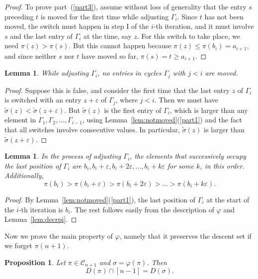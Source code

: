 \documentclass[11pt]{amsart}
\newtheorem{prop}[theorem]{Proposition}
\newtheorem{lemma}[theorem]{Lemma}
\newcommand\C{\mathcal C}
\newcommand\wt{\widetilde}
\newcommand\bij{\varphi}
\newcommand\eps{\varepsilon}
\newcommand\sigm{\wt\sigma}
\begin{document}
\begin{proof}
To prove part~(\ref{part3}), assume without loss of generality that the entry $s$ preceding $t$ is moved for the first time while adjusting $\Gamma_i$.
Since $t$ has not been moved, the switch must happen in step I of the $i$-th iteration, and it must involve $s$ and the last entry of $\Gamma_i$ at the time, say $z$. For this switch to take place,
we need $\pi(z)>\pi(s)$. But this cannot happen because $\pi(z)\le\pi(b_i)=a_{i+1}$, and since neither $s$ nor $t$ have moved so far, $\pi(s)=t\ge a_{i+1}$.
\end{proof}


\begin{lemma}\label{lem:notback} While adjusting $\Gamma_i$, no entries in cycles $\Gamma_j$ with $j<i$ are moved.
\end{lemma}

\begin{proof} Suppose this is false, and consider the first time that the last entry $z$ of $\Gamma_i$ is switched with an entry $z+\eps$ of $\Gamma_j$, where $j<i$.
Then we must have $\sigm(z)<\sigm(z+\eps)$. But $\sigm(z)$ is the first entry of $\Gamma_i$, which is larger than any element in $\Gamma_1,\Gamma_2,\dots,\Gamma_{i-1}$, using Lemma~\ref{lem:notmoved}(\ref{part1})
and the fact that all switches involve consecutive values. In particular, $\sigm(z)$ is larger than $\sigm(z+\eps)$.
\end{proof}

\begin{lemma}\label{lem:bi}
In the process of adjusting $\Gamma_i$, the elements that successively occupy the last position of $\Gamma_i$ are $b_i,b_i+\eps,b_i+2\eps,\dots,b_i+k\eps$ for some $k$, in this order. Additionally,
$$\pi(b_i)>\pi(b_i+\eps)>\pi(b_i+2\eps)>\dots>\pi(b_i+k\eps).$$
\end{lemma}

\begin{proof}
By Lemma~\ref{lem:notmoved}(\ref{part1}), the last position of $\Gamma_i$ at the start of the $i$-th iteration is $b_i$.
The rest follows easily from the description of $\bij$ and Lemma~\ref{lem:decrpi}.
\end{proof}

Now we prove the main property of $\bij$, namely that it preserves the descent set if we forget $\pi(n+1)$.

\begin{prop}\label{prop:descents}
Let $\pi\in\C_{n+1}$ and $\sigma=\bij(\pi)$. Then $$D(\pi)\cap[n-1]=D(\sigma).$$
\end{prop}
\end{document}
